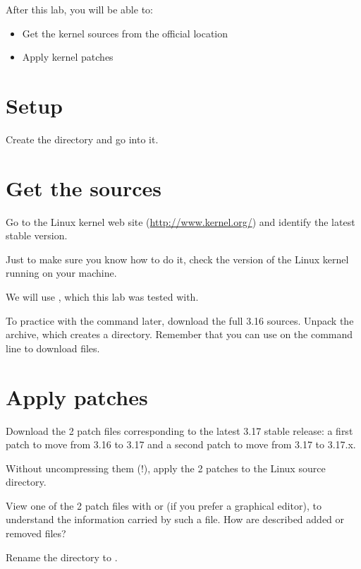 
After this lab, you will be able to:
\begin{itemize}
\item Get the kernel sources from the official location
\item Apply kernel patches
\end{itemize}

\section{Setup}

Create the  directory and go into it.

\section{Get the sources}

Go to the Linux kernel web site (\url{http://www.kernel.org/}) and
identify the latest stable version.

Just to make sure you know how to do it, check the version of the
Linux kernel running on your machine.

We will use , which this lab was tested with.

To practice with the  command later, download the full 3.16
sources. Unpack the archive, which creates a 
directory. Remember that you can use  on the command
line to download files.

\section{Apply patches}

Download the 2 patch files corresponding to the latest 3.17 stable
release: a first patch to move from 3.16 to 3.17 and a second patch to
move from 3.17 to 3.17.x.

Without uncompressing them (!), apply the 2 patches to the Linux
source directory.

View one of the 2 patch files with  or 
(if you prefer a graphical editor), to understand the information carried
by such a file. How are described added or removed files?

Rename the  directory to .

